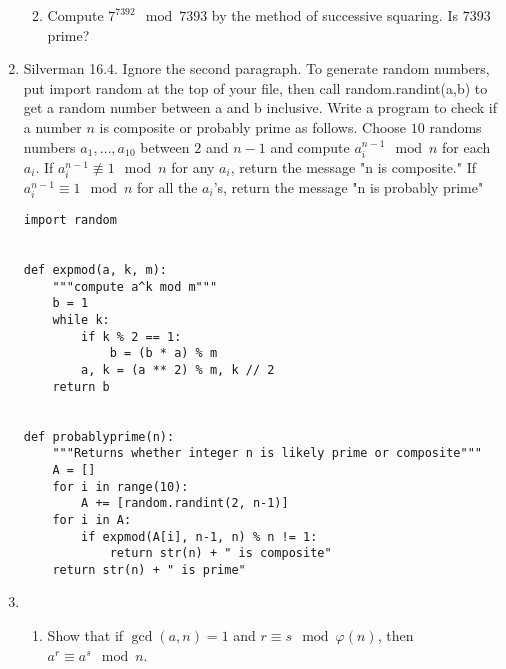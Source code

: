 \documentclass[10pt,twoside]{article}
\begin{document}
\begin{enumerate}[itemsep=2em,label=\Alph*.]
\begin{enumerate}[label=(\alph*)]

            \item Compute $7^{7392} \mod{7393}$ by the method of successive squaring. Is $7393$ prime? 

        
        \end{enumerate}
    \item Silverman 16.4. Ignore the second paragraph. To generate random numbers, put import random at the top of your file, then call random.randint(a,b) to get a random number between a and b inclusive. Write a program to check if a number $n$ is composite or probably prime as follows. Choose $10$ randoms numbers $a_1,\ldots,a_{10}$ between $2$ and $n-1$ and compute $a_i^{n-1} \mod{n}$ for each $a_i$. If $a_i^{n-1} \not\equiv 1 \mod{n}$ for any $a_i$, return the message "n is composite." If $a_i^{n-1} \equiv 1 \mod{n}$ for all the $a_i$'s, return the message "n is probably prime"
   
   
        \begin{lstlisting}
import random

        
def expmod(a, k, m):
    """compute a^k mod m"""
    b = 1
    while k:
        if k % 2 == 1:
            b = (b * a) % m
        a, k = (a ** 2) % m, k // 2
    return b


def probablyprime(n):
    """Returns whether integer n is likely prime or composite"""
    A = []
    for i in range(10):
        A += [random.randint(2, n-1)]
    for i in A:
        if expmod(A[i], n-1, n) % n != 1:
            return str(n) + " is composite"
    return str(n) + " is prime"
        \end{lstlisting}                


    \item 
        \begin{enumerate}[label=\arabic*.]
            \item Show that if $\gcd(a,n)=1$ and $r \equiv s \mod{\varphi(n)}$, then $a^r \equiv a^s \mod{n}$.


\end{enumerate}
\end{enumerate}
\end{document}

